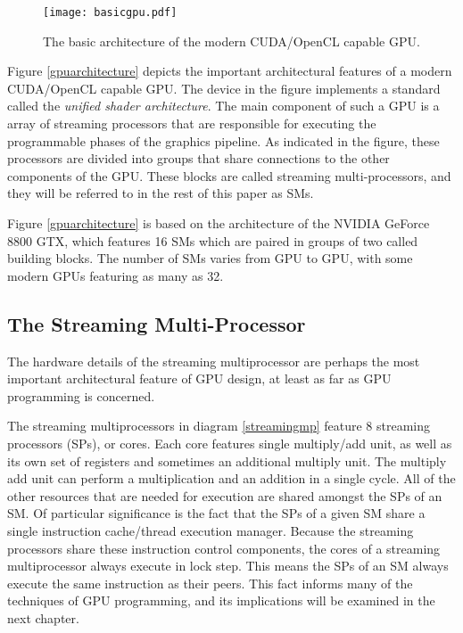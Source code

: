 \documentclass[12pt,twoside]{reedthesis}
\newcommand{\im}[1]{{\em#1}}
\begin{document}
\begin{figure}[h!]
\begin{center}
\texttt{[image: basicgpu.pdf]}
\end{center}
\caption{The basic architecture of the modern CUDA/OpenCL capable GPU.}
\end{figure}
\label{gpuarchitecture}

Figure \ref{gpuarchitecture} depicts the important architectural features of a modern CUDA/OpenCL capable GPU. The device in the figure implements a standard called the \im{unified shader architecture}. The main component of such a GPU is a array of streaming processors that are responsible for executing the programmable phases of the graphics pipeline. As indicated in the figure, these processors are divided into groups that share connections to the other components of the GPU. These blocks are called streaming multi-processors, and they will be referred to in the rest of this paper as SMs.


Figure \ref{gpuarchitecture} is based on the architecture of the NVIDIA GeForce 8800 GTX, which features 16 SMs which are paired in groups of two called building blocks. The number of SMs varies from GPU to GPU, with some modern GPUs featuring as many as 32.

\subsection{The Streaming Multi-Processor}
\label{smpsec}

The hardware details of the streaming multiprocessor are perhaps the most important architectural feature of GPU design, at least as far as GPU programming is concerned.

The streaming multiprocessors in diagram \ref{streamingmp} feature 8 streaming processors (SPs), or cores. Each core features single multiply/add unit, as well as its own set of registers and sometimes an additional multiply unit. The multiply add unit can perform a multiplication and an addition in a single cycle. All of the other resources that are needed for execution are shared amongst the SPs of an SM.
Of particular significance is the fact that the SPs of a given SM share a single instruction cache/thread execution manager. Because the streaming processors share these instruction control components, the cores of a streaming multiprocessor always execute in lock step. This means the SPs of an SM always execute the same instruction as their peers. This fact informs many of the techniques of GPU programming, and its implications will be examined in the next chapter.
\end{document}
